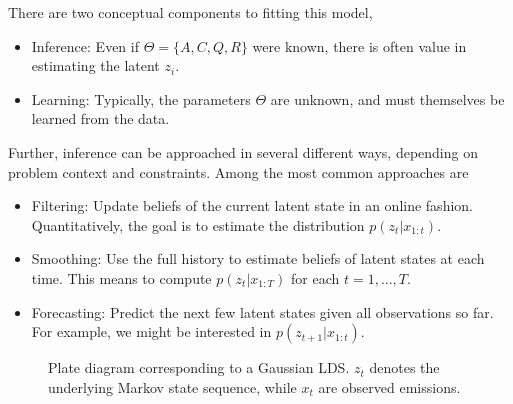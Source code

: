 There are two conceptual components to fitting this model,
\begin{itemize}
\item Inference: Even if $\Theta = \{A, C, Q, R\}$ were known, there
  is often value in estimating the latent $z_{i}$.
\item Learning: Typically, the parameters $\Theta$ are unknown, and must
  themselves be learned from the data.
\end{itemize}

Further, inference can be approached in several different ways, depending on
problem context and constraints. Among the most common approaches are
\begin{itemize}
\item Filtering: Update beliefs of the current latent state in an online
  fashion. Quantitatively, the goal is to estimate the distribution
  $p\left(z_{t} \vert x_{1:t}\right)$.
\item Smoothing: Use the full history to estimate beliefs of latent states at
  each time. This means to compute $p\left(z_{t} \vert x_{1:T}\right)$ for each
  $t = 1, \dots, T$.
\item Forecasting: Predict the next few latent states given all observations so
  far. For example, we might be interested in $p\left(z_{t + 1} \vert
  x_{1:t}\right)$.
\end{itemize}

\begin{figure}
  \centering
  \caption{Plate diagram corresponding to a Gaussian LDS. $z_{t}$ denotes the
    underlying Markov state sequence, while $x_t$ are observed
    emissions. \label{fig:lds_graphical} }
\end{figure}

